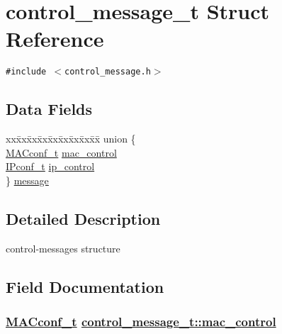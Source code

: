 \hypertarget{structcontrol__message__t}{
\section{control\_\-message\_\-t Struct Reference}
\label{structcontrol__message__t}
}
{\tt \#include $<$control\_\-message.h$>$}

\subsection*{Data Fields}
\begin{CompactItemize}
\item 
\begin{tabbing}
xx\=xx\=xx\=xx\=xx\=xx\=xx\=xx\=xx\=\kill
union \{\\
\>\hyperlink{structMACconf__t}{MACconf\_t} \hyperlink{structcontrol__message__t_2f1fbfa937648a9d40ef18da0dd85a26}{mac\_control}\\
\>\hyperlink{structIPconf__t}{IPconf\_t} \hyperlink{structcontrol__message__t_a7fedb2fdb523167bdbcc1a1fbde5576}{ip\_control}\\
\} \hyperlink{structcontrol__message__t_75a5f0af56a265cf8491405c290fef02}{message}\\

\end{tabbing}\end{CompactItemize}


\subsection{Detailed Description}
control-messages structure 



\subsection{Field Documentation}
\hypertarget{structcontrol__message__t_2f1fbfa937648a9d40ef18da0dd85a26}{
\subsubsection[mac\_\-control]{\setlength{\rightskip}{0pt plus 5cm}\hyperlink{structMACconf__t}{MACconf\_\-t} \hyperlink{structcontrol__message__t_2f1fbfa937648a9d40ef18da0dd85a26}{control\_\-message\_\-t::mac\_\-control}}}
\label{structcontrol__message__t_2f1fbfa937648a9d40ef18da0dd85a26}



